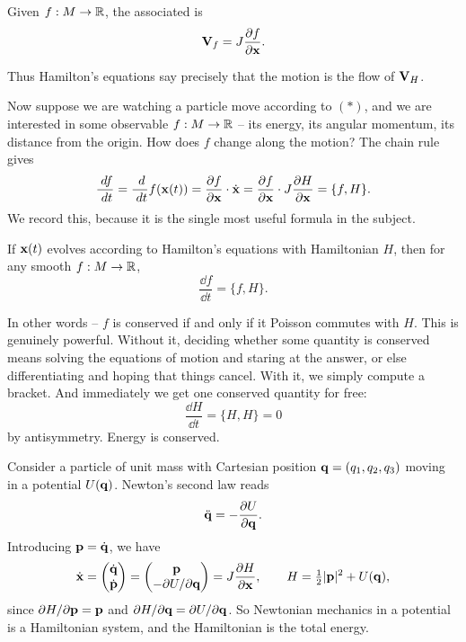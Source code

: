 \documentclass[a4paper]{scrartcl}
\begin{document}
\begin{definition}
	Given $f : M \to \mathbb{R}$, the associated  is
	$$
	\mathbf{V}_f = J \frac{\partial f}{\partial \mathbf{x}}.
	$$
\end{definition}

Thus Hamilton's equations say precisely that the motion is the flow of $\mathbf{V}_H$.

Now suppose we are watching a particle move according to $(*)$, and we are interested in some observable $f : M \to \mathbb{R}$ -- its energy, its angular momentum, its distance from the origin. How does $f$ change along the motion? The chain rule gives
$$
\frac{\; d f}{\; d t} = \frac{\; d}{\; d t}f(\mathbf{x}(t)) = \frac{\partial f}{\partial \mathbf{x}}\cdot \dot{\mathbf{x}} = \frac{\partial f}{\partial \mathbf{x}}\cdot J\frac{\partial H}{\partial \mathbf{x}} = \{f, H\}.
$$
We record this, because it is the single most useful formula in the subject.

\begin{proposition}
	If $\mathbf{x}(t)$ evolves according to Hamilton's equations with Hamiltonian $H$, then for any smooth $f : M \to \mathbb{R}$,
	$$
	\frac{\dd f}{\dd t} = \{f, H\}.
	$$
\end{proposition}

In other words -- $f$ is conserved if and only if it Poisson commutes with $H$. This is genuinely powerful. Without it, deciding whether some quantity is conserved means solving the equations of motion and staring at the answer, or else differentiating and hoping that things cancel. With it, we simply compute a bracket. And immediately we get one conserved quantity for free:
$$
\frac{\dd H}{\dd t} = \{H, H\} = 0
$$
by antisymmetry. Energy is conserved.

\begin{example}
	Consider a particle of unit mass with Cartesian position $\mathbf{q} = (q_1,q_2,q_3)$ moving in a potential $U(\mathbf{q})$. Newton's second law reads
	$$
	\ddot{\mathbf{q}} = -\frac{\partial U}{\partial \mathbf{q}}.
	$$
	Introducing $\mathbf{p} = \dot{\mathbf{q}}$, we have
	$$
	\dot{\mathbf{x}} = \begin{pmatrix}\dot{\mathbf{q}}\\ \dot{\mathbf{p}}\end{pmatrix} = \begin{pmatrix} \mathbf{p} \\ -\partial U/\partial \mathbf{q}\end{pmatrix} = J\frac{\partial H}{\partial \mathbf{x}}, \qquad H = \tfrac{1}{2}|\mathbf{p}|^2 + U(\mathbf{q}),
	$$
	since $\partial H/\partial \mathbf{p} = \mathbf{p}$ and $\partial H/\partial\mathbf{q} = \partial U/\partial \mathbf{q}$. So Newtonian mechanics in a potential is a Hamiltonian system, and the Hamiltonian is the total energy.
\end{example}
\end{document}

